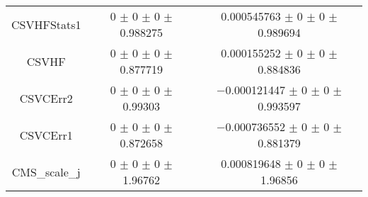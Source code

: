 \begin{table}
\begin{tabular}{ccc}
CSVHFStats1 & \num{0} $\pm$ \num{0} $\pm$ \num{0} $\pm$ \num{0.988275} & \num{0.000545763} $\pm$ \num{0} $\pm$ \num{0} $\pm$ \num{0.989694}\\
CSVHF & \num{0} $\pm$ \num{0} $\pm$ \num{0} $\pm$ \num{0.877719} & \num{0.000155252} $\pm$ \num{0} $\pm$ \num{0} $\pm$ \num{0.884836}\\
CSVCErr2 & \num{0} $\pm$ \num{0} $\pm$ \num{0} $\pm$ \num{0.99303} & \num{-0.000121447} $\pm$ \num{0} $\pm$ \num{0} $\pm$ \num{0.993597}\\
CSVCErr1 & \num{0} $\pm$ \num{0} $\pm$ \num{0} $\pm$ \num{0.872658} & \num{-0.000736552} $\pm$ \num{0} $\pm$ \num{0} $\pm$ \num{0.881379}\\
CMS\_scale\_j & \num{0} $\pm$ \num{0} $\pm$ \num{0} $\pm$ \num{1.96762} & \num{0.000819648} $\pm$ \num{0} $\pm$ \num{0} $\pm$ \num{1.96856}\\
\bottomrule
\end{tabular}
\end{table}